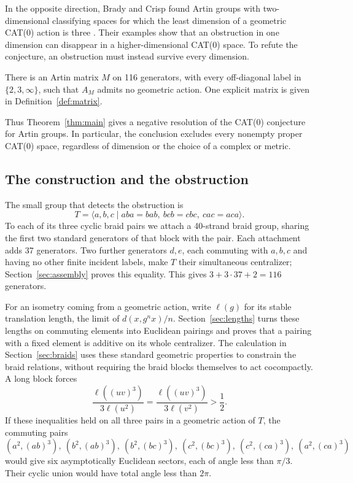 In the opposite direction, Brady and Crisp found Artin groups with
two-dimensional classifying spaces for which the least dimension of
a geometric CAT(0) action is three
\cite[preprint Theorems~B and~3.1]{BradyCrisp2002}.
Their examples show that an
obstruction in one dimension can disappear in a higher-dimensional
CAT(0) space.  To refute the conjecture, an obstruction must instead
survive every dimension.

\begin{theorem}\label{thm:main}
There is an Artin matrix \(M\) on 116 generators, with every
off-diagonal label in \(\{2,3,\infty\}\), such that \(A_M\) admits no
geometric action.  One explicit matrix is given in
Definition~\ref{def:matrix}.
\end{theorem}

Thus Theorem~\ref{thm:main} gives a negative resolution of the
CAT(0) conjecture for Artin groups.
In particular, the conclusion excludes every nonempty proper CAT(0)
space, regardless of dimension or the choice of a complex or metric.

\subsection*{The construction and the obstruction}

The small group that detects the obstruction is
\[
 T=\langle a,b,c\mid aba=bab,\ bcb=cbc,\ cac=aca\rangle.
\]
To each of its three cyclic braid pairs we attach a 40-strand braid
group, sharing the first two standard generators of that block with the
pair.  Each attachment adds 37 generators.  Two further generators
\(d,e\), each commuting with \(a,b,c\) and having no other finite
incident labels, make \(T\) their simultaneous centralizer;
Section~\ref{sec:assembly} proves this equality.  This gives \(3+3\cdot37+2=116\) generators.

For an isometry coming from a geometric action, write \(\ell(g)\) for its
stable translation length, the limit of \(d(x,g^n x)/n\).
Section~\ref{sec:lengths} turns these lengths on commuting elements into
Euclidean pairings and proves that a pairing with a fixed element is
additive on its whole centralizer.  The calculation in
Section~\ref{sec:braids} uses these standard geometric properties to
constrain the braid relations, without requiring the braid blocks
themselves to act cocompactly.  A long block forces
\[
 \frac{\ell((uv)^3)}{3\ell(u^2)}
 =\frac{\ell((uv)^3)}{3\ell(v^2)}>\frac12.
\]
If these inequalities held on all three pairs in a geometric action of
\(T\), the commuting pairs
\[
 (a^2,(ab)^3),\ (b^2,(ab)^3),\
 (b^2,(bc)^3),\ (c^2,(bc)^3),\
 (c^2,(ca)^3),\ (a^2,(ca)^3)
\]
would give six asymptotically Euclidean sectors, each of angle less than
\(\pi/3\).  Their cyclic union would have total angle less than \(2\pi\).

